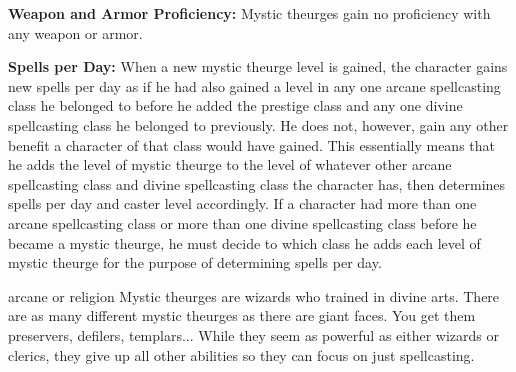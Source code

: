 {
\textbf{Weapon and Armor Proficiency:} Mystic theurges gain no proficiency with any weapon or armor.

\textbf{Spells per Day:} When a new mystic theurge level is gained, the character gains new spells per day as if he had also gained a level in any one arcane spellcasting class he belonged to before he added the prestige class and any one divine spellcasting class he belonged to previously. He does not, however, gain any other benefit a character of that class would have gained. This essentially means that he adds the level of mystic theurge to the level of whatever other arcane spellcasting class and divine spellcasting class the character has, then determines spells per day and caster level accordingly. If a character had more than one arcane spellcasting class or more than one divine spellcasting class before he became a mystic theurge, he must decide to which class he adds each level of mystic theurge for the purpose of determining spells per day.
}
{}
{arcane or religion}
{Mystic theurges are wizards who trained in divine arts.}
{There are as many different mystic theurges as there are giant faces. You get them preservers, defilers, templars...}
{While they seem as powerful as either wizards or clerics, they give up all other abilities so they can focus on just spellcasting.}